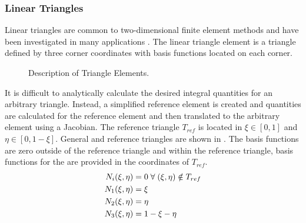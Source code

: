     \subsubsection{Linear Triangles}
      Linear triangles are common to two-dimensional finite element methods and
      have been investigated in many applications
      \cite{Hosseini2017,Hosseini2013,Hosseini2015}. The linear triangle element 
      is a triangle defined by three corner coordinates with basis functions 
      located on each corner. 

      \begin{figure}
        \centering
        \vspace{0.2in}
        \caption{Description of Triangle Elements.}
        \label{fig:triangle_elements}
      \end{figure}

      It is difficult to analytically calculate the desired integral quantities
      for an arbitrary triangle. Instead, a simplified reference element is
      created and quantities are calculated for the reference element and then
      translated to the arbitrary element using a Jacobian. 
      The reference triangle $T_{ref}$ is located in
      $\xi \in [0,1]$ and $\eta \in [0,1-\xi]$. General and reference triangles
      are shown in . The
      basis functions are zero outside of the reference triangle and within the
      reference triangle, basis functions for the are provided in the
      coordinates of $T_{ref}$.
      \begin{align}
        N_i(\xi,\eta) &= 0 \; \forall \; (\xi,\eta) \notin T_{ref} \\
        N_1(\xi,\eta) &= \xi \\
        N_2(\xi,\eta) &= \eta \\
        N_3(\xi,\eta) &= 1-\xi-\eta
      \end{align}
      
